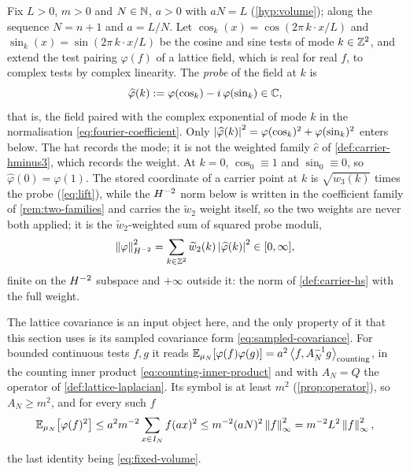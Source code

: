 Fix $L>0$, $m>0$ and $N\in\mathbb{N}$, $a>0$ with $aN=L$ (\cref{hyp:volume});
along the sequence $N=n+1$ and $a=L/N$. Let
$\cos_k(x)=\cos(2\pi\,k\cdot x/L)$ and
$\sin_k(x)=\sin(2\pi\,k\cdot x/L)$ be the cosine and sine tests of mode
$k\in\mathbb{Z}^2$, and extend the test pairing $\varphi(f)$ of a lattice field,
which is real for real $f$, to complex tests by complex linearity. The
\emph{probe} of the field at $k$ is
\begin{equation}\label{eq:probe}
  \widehat\varphi(k):=\varphi(\cos_k)-i\,\varphi(\sin_k)\in\mathbb{C} ,
\end{equation}
that is, the field paired with the complex exponential of mode $k$ in the
normalisation \eqref{eq:fourier-coefficient}. Only
$\left| \widehat\varphi(k) \right|^2=\varphi(\cos_k)^2+\varphi(\sin_k)^2$ enters
below. The hat records the mode; it is not the weighted family
$\widehat c$ of \cref{def:carrier-hminus3}, which records the weight. At
$k=0$, $\cos_0\equiv1$ and $\sin_0\equiv0$, so $\widehat\varphi(0)
=\varphi(1)$. The stored coordinate of a carrier point at $k$ is
$\sqrt{w_3(k)}$ times the probe (\cref{eq:lift}), while the $H^{-2}$ norm below
is written in the coefficient family of \cref{rem:two-families} and carries the
$\widetilde w_2$ weight itself, so the two weights are never both applied; it is
the $\widetilde w_2$-weighted sum of squared probe moduli,
\begin{equation}\label{eq:energy}
  \left\| \varphi \right\|^2_{H^{-2}}
  =\sum_{k\in\mathbb{Z}^2}\widetilde w_2(k)\left| \widehat\varphi(k) \right|^2
  \in[0,\infty],
\end{equation}
finite on the $H^{-2}$ subspace and $+\infty$ outside it: the norm of
\cref{def:carrier-hs} with the full weight.

The lattice covariance is an input object here, and the only property of it
that this section uses is its sampled covariance form
\cref{eq:sampled-covariance}. For bounded continuous tests $f,g$ it reads
$\mathbb{E}_{\mu_N}[\varphi(f)\varphi(g)]
=a^{2}\left\langle f, A_N^{-1}g \right\rangle_{\mathrm{counting}}$, in the counting inner product
\eqref{eq:counting-inner-product} and with $A_N=Q$ the operator of
\cref{def:lattice-laplacian}. Its symbol is at least $m^2$
(\cref{prop:operator}), so $A_N\ge m^{2}$, and for every such $f$
\begin{equation}\label{eq:per-test}
  \mathbb{E}_{\mu_N}\bigl[\varphi(f)^2\bigr]
  \le a^{2}m^{-2}\sum_{x\in I_N}f(ax)^2
  \le m^{-2}(aN)^{2}\left\| f \right\|_\infty^{2}
  =m^{-2}L^{2}\left\| f \right\|_\infty^{2},
\end{equation}
the last identity being \eqref{eq:fixed-volume}.

